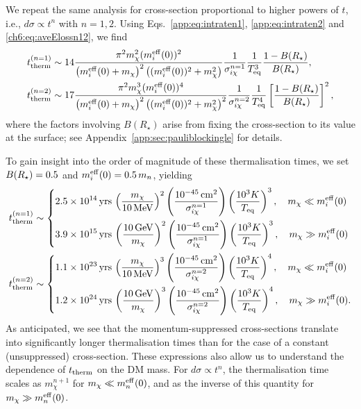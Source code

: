 We repeat the same analysis for cross-section proportional to higher powers of $t$, i.e., $d\sigma \propto t^n$ with $n=1,2$. Using Eqs.~\ref{app:eq:intraten1}, \ref{app:eq:intraten2} and \ref{ch6:eq:aveElossn12}, we find
% 
\small
\begin{align}
    \tthn{1} &\sim 14 %
    \frac{\pi^2 m_\chi^2 (\mbeff(0))^2}{\left(\mbeff(0) + m_\chi\right)^2 \left((\mbeff(0))^2+ m_\chi^2\right)}\frac{1}{\sigma_{i\chi}^{n=1}}\frac{1}{T_{\rm eq}^3} \frac{1-B(\Rstar)}{B(\Rstar)},  
    \label{ch6:eq:thermtimen1}\\
    \tthn{2} &\sim 17 %
    \frac{\pi^2 m_\chi^3 (\mbeff(0))^4}{\left(\mbeff(0) + m_\chi\right)^2 \left((\mbeff(0))^2+ m_\chi^2\right)^2}\frac{1}{\sigma_{i\chi}^{n=2}}\frac{1}{T_{\rm eq}^4} \left[\frac{1-B(\Rstar)}{B(\Rstar)}\right]^2, 
    \label{ch6:eq:thermtimen2}
\end{align}
\normalsize
% 
where the factors involving $B(R_\star)$ arise from fixing the cross-section to its value at the surface; 
see Appendix~\ref{app:sec:pauliblockingle} for details.


To gain insight into the order of magnitude of these thermalisation times, we set  $B(R_\star)=0.5$ and $m_i^{\rm eff}(0) = 0.5\,m_n$, yielding
% 
\footnotesize{
\begin{align}
    t_{\rm therm}^{(n=1)} &\sim \begin{dcases}
        2.5\times 10^{14}{\rm \,yrs} \, \left(\frac{m_\chi}{10{\rm \,MeV}}\right)^2\left(\frac{10^{-45}{\rm \,cm}^2}{\sigma_{i\chi}^{n=1}}\right)\left(\frac{10^3K}{T_{\rm eq}}\right)^{3},\quad m_\chi \ll m_i^{\rm eff}(0)\\
        3.9\times 10^{15}{\rm \,yrs} \, \left(\frac{10{\rm \,GeV}}{m_\chi}\right)^2\left(\frac{10^{-45}{\rm \,cm}^2}{\sigma_{i\chi}^{n=1}}\right)\left(\frac{10^3K}{T_{\rm eq}}\right)^{3},\quad m_\chi \gg m_i^{\rm eff}(0)
    \end{dcases}
    \label{ch6:eq:t_therm_1} \\
   t_{\rm therm}^{(n=2)} &\sim\begin{dcases}
        1.1\times 10^{23}{\rm \,yrs} \, \left(\frac{m_\chi}{10{\rm \,MeV}}\right)^3\left(\frac{10^{-45}{\rm \,cm}^2}{\sigma_{i\chi}^{n=2}}\right)\left(\frac{10^3K}{T_{\rm eq}}\right)^{4},\quad m_\chi \ll m_i^{\rm eff}(0)\\
        1.2\times 10^{24}{\rm \,yrs} \, \left(\frac{10{\rm \,GeV}}{m_\chi}\right)^3\left(\frac{10^{-45}{\rm \,cm}^2}{\sigma_{i\chi}^{n=2}}\right)\left(\frac{10^3K}{T_{\rm eq}}\right)^{4},\quad m_\chi \gg m_i^{\rm eff}(0).
    \end{dcases}
    \label{ch6:eq:t_therm_2}
\end{align} 
}
\normalsize
% 
As anticipated, we see that the momentum-suppressed cross-sections translate into significantly longer thermalisation times than for the case of a constant (unsuppressed) cross-section.
These expressions also allow us to understand the dependence of $t_{\rm therm}$ on the DM mass.
For $d\sigma\propto t^n$, the thermalisation time scales as $m_\chi^{n+1}$ for $m_\chi \ll m_n^{\rm eff}(0)$, and as the inverse of this quantity for $m_\chi \gg m_n^{\rm eff}(0)$.



